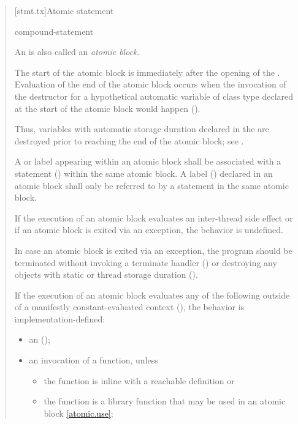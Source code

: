 \begin{quote}
[stmt.tx]{Atomic statement}  

\begin{bnf}
\br
      compound-statement
\end{bnf}

\pnum
An  is also called an \emph{atomic block}.

\pnum
The start of the atomic block is immediately after the
opening \tcode{\{} of the .
Evaluation of the end of the atomic block occurs
when the invocation of the destructor for a hypothetical automatic
variable of class type declared at the start of the atomic block would
happen ().

\begin{note}
Thus, variables with automatic storage duration
declared in the 
are destroyed prior to reaching the end of the atomic block;
see .
\end{note}

\pnum
A  or  label
appearing within an atomic block shall be associated with a
 statement () within the same
atomic block. A label () declared in an atomic block
shall only be referred to by a statement in the same atomic block.

\pnum
If the execution of an atomic block evaluates an inter-thread side
effect or if an atomic block is exited
via an exception, the behavior is undefined.

\pnum
\recommended
In case an atomic block is exited via an exception,
the program should be terminated
without invoking a terminate handler () or
destroying any objects
with static or thread storage duration ().

\pnum
If the execution of an atomic block evaluates any of the following
outside of a manifestly constant-evaluated context (),
the behavior is implementation-defined:

\begin{itemize}
\item
  an  ();
\item
  an invocation of a function, unless
  \begin{itemize}
  \tightlist
  \item
    {the function is inline with a reachable definition or}
  \item
    {the function is a library function that may be used in an atomic
    block \ref{atomic.use};}
  \end{itemize}


\end{itemize}
\end{quote}
